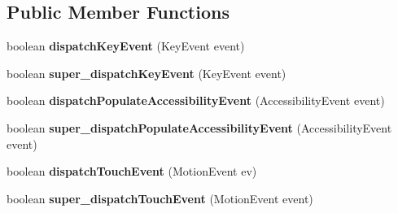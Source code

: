 \subsection*{Public Member Functions}
\begin{DoxyCompactItemize}
\item 
\mbox{\label{classorg_1_1qtproject_1_1qt5_1_1android_1_1bindings_1_1_qt_activity_a3419f10b60670ae0fd0a222fcd684273}} 
boolean {\bfseries dispatch\+Key\+Event} (Key\+Event event)
\item 
\mbox{\label{classorg_1_1qtproject_1_1qt5_1_1android_1_1bindings_1_1_qt_activity_a0222dd1edd412d5573914d8e563d8dfc}} 
boolean {\bfseries super\+\_\+dispatch\+Key\+Event} (Key\+Event event)
\item 
\mbox{\label{classorg_1_1qtproject_1_1qt5_1_1android_1_1bindings_1_1_qt_activity_a7eacf9d228567bace814d7d90cc88dc1}} 
boolean {\bfseries dispatch\+Populate\+Accessibility\+Event} (Accessibility\+Event event)
\item 
\mbox{\label{classorg_1_1qtproject_1_1qt5_1_1android_1_1bindings_1_1_qt_activity_a174082c8c4aa301a2a8c78ce237bca22}} 
boolean {\bfseries super\+\_\+dispatch\+Populate\+Accessibility\+Event} (Accessibility\+Event event)
\item 
\mbox{\label{classorg_1_1qtproject_1_1qt5_1_1android_1_1bindings_1_1_qt_activity_a080d702cac33de4a97b4645567cf8c04}} 
boolean {\bfseries dispatch\+Touch\+Event} (Motion\+Event ev)
\item 
\mbox{\label{classorg_1_1qtproject_1_1qt5_1_1android_1_1bindings_1_1_qt_activity_a8525630fd66e1d88e94f7bc9457bbd1b}} 
boolean {\bfseries super\+\_\+dispatch\+Touch\+Event} (Motion\+Event event)
\item 
\mbox{\label{classorg_1_1qtproject_1_1qt5_1_1android_1_1bindings_1_1_qt_activity_ad305b6d78907e6fc4bc4fa9b77256a22}} 

\end{DoxyCompactItemize}
